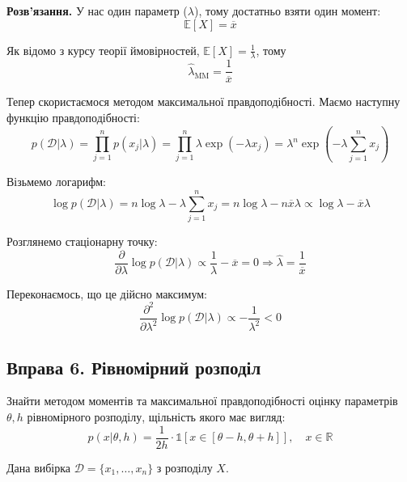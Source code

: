 \documentclass{hw_template}
\begin{document}
\textbf{Розв'язання.} У нас один параметр ($\lambda$), тому достатньо взяти один момент:
\begin{equation*}
    \mathbb{E}[X] = \overline{x}
\end{equation*}

Як відомо з курсу теорії ймовірностей, $\mathbb{E}[X] = \frac{1}{\lambda}$, тому
\begin{equation*}
    \hat{\lambda}_{\text{MM}} = \frac{1}{\overline{x}}
\end{equation*}

Тепер скористаємося методом максимальної правдоподібності. Маємо наступну функцію правдоподібності:
\begin{equation*}
    p(\mathcal{D} | \lambda) = \prod_{j=1}^n p(x_j | \lambda) = \prod_{j=1}^n \lambda\exp(-\lambda x_j) = \lambda^n\exp\left(-\lambda\sum_{j=1}^n x_j\right)
\end{equation*}

Візьмемо логарифм:
\begin{equation*}
    \log p(\mathcal{D} | \lambda) = n\log\lambda - \lambda\sum_{j=1}^n x_j = n \log\lambda - n\overline{x}\lambda \propto \log\lambda - \overline{x}\lambda
\end{equation*}

Розглянемо стаціонарну точку:
\begin{equation*}
    \frac{\partial}{\partial \lambda} \log p(\mathcal{D} | \lambda) \propto \frac{1}{\lambda} - \overline{x} = 0 \Rightarrow \boxed{\hat{\lambda} = \frac{1}{\overline{x}}}
\end{equation*}

Переконаємось, що це дійсно максимум:
\begin{equation*}
    \frac{\partial^2}{\partial \lambda^2} \log p(\mathcal{D} | \lambda) \propto -\frac{1}{\lambda^2} < 0
\end{equation*}

\pagebreak

\subsection{Вправа 6. Рівномірний розподіл}

\begin{problem}
    Знайти методом моментів та максимальної правдоподібності оцінку параметрів $\theta,h$ рівномірного розподілу, щільність якого має вигляд:
    \begin{equation*}
        p(x|\theta,h) = \frac{1}{2h} \cdot \mathds{1}[x \in [\theta-h,\theta+h]], \quad x \in \mathbb{R}
    \end{equation*}

    Дана вибірка $\mathcal{D} = \{x_1,\dots,x_n\}$ з розподілу $X$.
\end{problem}
\end{document}
